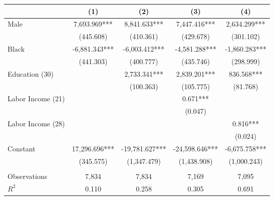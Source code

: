 \begin{tabular}{lcccc} \toprule
 & (1) & (2) & (3) & (4) \\ \midrule
Male & 7,693.969*** & 8,841.633*** & 7,447.416*** & 2,634.299*** \\
 & (445.608) & (410.361) & (429.678) & (301.102) \\
Black & -6,881.343*** & -6,003.412*** & -4,581.288*** & -1,860.283*** \\
 & (441.303) & (400.777) & (435.746) & (298.999) \\
Education (30) &  & 2,733.341*** & 2,839.201*** & 836.568*** \\
 &  & (100.363) & (105.775) & (81.768) \\
Labor Income (21) &  &  & 0.671*** &  \\
 &  &  & (0.047) &  \\
Labor Income (28) &  &  &  & 0.816*** \\
 &  &  &  & (0.024) \\
Constant & 17,296.696*** & -19,781.627*** & -24,598.646*** & -6,675.758*** \\
 & (345.575) & (1,347.479) & (1,438.908) & (1,000.243) \\ \\ \midrule
Observations & 7,834 & 7,834 & 7,169 & 7,095 \\
$R^2$ & 0.110 & 0.258 & 0.305 & 0.691 \\ \bottomrule
\end{tabular}
